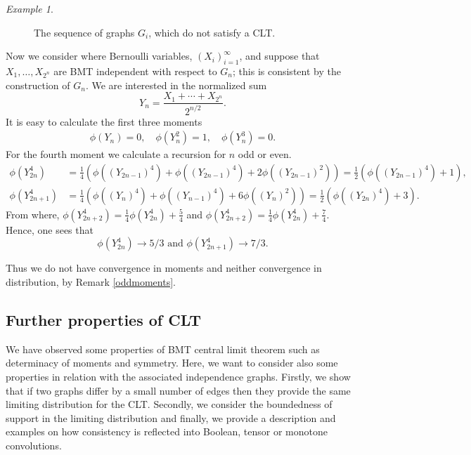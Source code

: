 \documentclass[a4paper,12pt]{extarticle}
\theoremstyle{definition}
\theoremstyle{remark}
\newtheorem{exa}[thm]{Example}
\begin{document}
\begin{exa}
\begin{figure}
\begin{center}

\end{center}
\caption{ \label{counterCLT} The sequence of graphs $G_i$, which do not satisfy a CLT.}
\end{figure}

	
	Now we consider where Bernoulli variables, $(X_i)^\infty_{i=1}$, and suppose that $X_1,\dots,X_{2^n}$ are BMT independent with respect to $G_n$; this is consistent by the construction of $G_n$.
	We are interested in the normalized sum $$Y_n=\frac{X_1+\cdots+X_{2^n}}{2^{n/2}}.$$It is easy to calculate the first three moments
	\begin{eqnarray}
		\phi(Y_n)=0, \quad
		\phi(Y_n^2)=1,\quad
		\phi(Y_n^3)=0.
	\end{eqnarray}
	For the fourth moment we calculate a recursion for $n$ odd or even.
	\begin{eqnarray*}\phi(Y_{2n}^4)&=\frac{1}{4}(\phi((Y_{2n-1})^4)+\phi(({Y}_{2n-1})^4)+2\phi((Y_{2n-1})^2))=\frac{1}{2}(\phi((Y_{2n-1})^4)+1),\\
		\phi(Y_{2n+1}^4)&=\frac{1}{4}(\phi((Y_{n})^4)+\phi(({Y}_{n-1})^4)+6\phi((Y_{n})^2))=\frac{1}{2}(\phi((Y_{2n})^4)+3).
	\end{eqnarray*}
	From where, $\phi(Y_{2n+2}^4)=\frac{1}{4}\phi(Y_{2n}^4)+\frac{5}{4}$
	and
	$\phi(Y_{2n+2}^4)=\frac{1}{4}\phi(Y_{2n}^4)+\frac{7}{4}.$
	Hence, one sees that $$\phi(Y_{2n}^4)\to 5/3\text{ and }\phi(Y_{2n+1}^4)\to 7/3.$$

 Thus we do not have convergence in moments and neither convergence in distribution, by Remark \ref{oddmoments}.


\end{exa}

\subsection{Further properties of CLT}

We have observed some properties of BMT central limit theorem such as determinacy of moments and symmetry.  Here, we want to consider also some properties in relation with the associated independence graphs. Firstly, we show that if two graphs differ by a small number of edges then they provide the same limiting distribution for the CLT. Secondly, we consider the boundedness of support in the limiting distribution and finally, we provide a description and examples on how consistency is reflected into Boolean, tensor or monotone convolutions.
\end{document}

